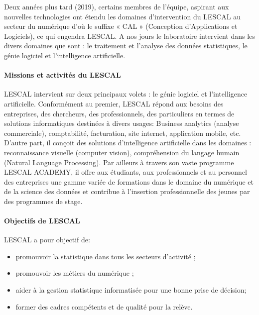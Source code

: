 Deux années plus tard (2019), certains membres de l'équipe, aspirant aux
nouvelles technologies ont étendu les domaines d'intervention du LESCAL
au secteur du numérique d'où le suffixe « CAL » (Conception
d'Applications et Logiciels), ce qui engendra LESCAL. A nos jours le
laboratoire intervient dans les divers domaines que sont : le traitement
et l'analyse des données statistiques, le génie logiciel et
l'intelligence artificielle.

\paragraph{Missions et activités du
LESCAL}\label{missions-et-activituxe9s-du-lescal}

LESCAL intervient sur deux principaux volets : le génie logiciel et
l'intelligence artificielle. Conformément au premier, LESCAL répond aux
besoins des entreprises, des chercheurs, des professionnels, des
particuliers en termes de solutions informatiques destinées à divers
usages: Business analytics (analyse commerciale), comptabilité,
facturation, site internet, application mobile, etc. D'autre part, il
conçoit des solutions d'intelligence artificielle dans les domaines :
reconnaissance visuelle (computer vision), compréhension du langage
humain (Natural Language Processing). Par ailleurs à travers son vaste
programme LESCAL ACADEMY, il offre aux étudiants, aux professionnels et
au personnel des entreprises une gamme variée de formations dans le
domaine du numérique et de la science des données et contribue à
l'insertion professionnelle des jeunes par des programmes de stage.

\paragraph{Objectifs de LESCAL}\label{objectifs-de-lescal}

LESCAL a pour objectif de:

\begin{itemize}
\item
  promouvoir la statistique dans tous les secteurs d'activité ;\\
\item
  promouvoir les métiers du numérique ;\\
\item
  aider à la gestion statistique informatisée pour une bonne prise de
  décision;\\
\item
  former des cadres compétents et de qualité pour la relève.
\end{itemize}

